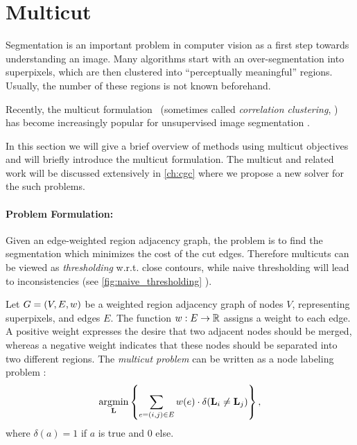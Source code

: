 
\section{Multicut}\label{sec:rw_multicut}

Segmentation is an important problem in computer vision as a first step
towards understanding an image. Many algorithms start with an over-segmentation
into superpixels, which are then clustered into ``perceptually meaningful''
regions.
Usually, the number of these regions is not known beforehand.

Recently, the multicut formulation~\cite{chopra_1993_mp}
(sometimes called \emph{correlation clustering}, \cite{bansal_2004_ml})
has become increasingly popular for unsupervised
image segmentation \cite{andres_2011_iccv,yarkony_2012_eccv,alush_2013_simbad}.

In this section we will give a brief overview of methods using multicut objectives
and will briefly introduce the multicut formulation.
The multicut and related work will be discussed extensively in \cref{ch:cgc} where
we propose a new solver for the such problems.

\paragraph{Problem Formulation:}
Given an edge-weighted region adjacency graph,
the problem is to find the segmentation which
minimizes the cost of the cut edges.
Therefore multicuts can be viewed as \emph{thresholding} w.r.t. close contours, while
naive thresholding will lead to inconsistencies 
(see \cref{fig:naive_thresholding} ).

Let $G=(V,E, w)$ be a weighted region adjacency graph of
nodes $V$, representing superpixels,
and edges $E$.
%
The function $w : E \rightarrow \mathbb{R}$ assigns a weight to each edge.
A positive weight expresses the desire that two adjacent nodes should
be merged, whereas a negative weight indicates
that these nodes should be separated into two different regions.
The \emph{multicut problem} can be written as a node labeling problem
\cite{bagon_2011_arxiv}:
%
\begin{align}
\operatorname*{\arg\!\min}_{\mathbf{L}}
    \left\{
    \sum_{ e=(i,j) \in E}
        w(e)
        \cdot \delta( \mathbf{L}_i \neq \mathbf{L}_j )
    \right\},
    \label{eq:multicut_primal_a}
\end{align}
%
where $\delta(a) = 1$ if $a$ is true and $0$ else.





